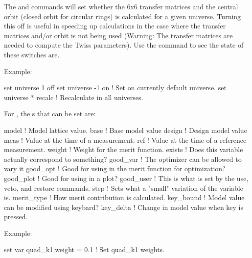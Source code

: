 {{\begin{description}
{{The  and  commands will set whether the 6x6
transfer matrices and the central orbit (closed orbit for circular
rings) is calculated for a given universe. Turning this off is useful
in speeding up calculations in the case where the transfer matrices and/or orbit
is not being used (Warning: The transfer matrices are needed to
compute the Twiss parameters). Use the  command to
see the state of these switches are.

Example:
\begin{example}
  set universe 1 off
  set universe -1 on    ! Set on currently default universe.
  set universe * recalc ! Recalculate in all universes.
\end{example}


\item[set variable <var\_name>|<component> = <value>] \Newline

\vskip -0.2in

For , the s that can be set are:
\begin{example}
  model       ! Model lattice value.
  base        ! Base model value
  design      ! Design model value
  meas        ! Value at the time of a measurement.
  ref         ! Value at the time of a reference measurement.
  weight      ! Weight for the merit function.
  exists      ! Does this variable actually correspond to something?
  good_var    ! The optimizer can be allowed to vary it
  good_opt    ! Good for using in the merit function for optimization?
  good_plot   ! Good for using in a plot?
  good_user   ! This is what is set by the use, veto, and restore commands.
  step        ! Sets what a "small" variation of the variable is.
  merit_type  ! How merit contribution is calculated.
  key_bound   ! Model value can be modified using keybard?
  key_delta   ! Change in model value when key is pressed.
\end{example}

Example:
\begin{example}
  set var quad\_k1|weight = 0.1         ! Set quad\_k1 weights. 
\end{example}


\item[set wave <component> = <value>] \Newline

}}
\end{description}}}
